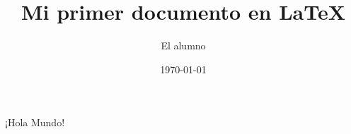 \documentclass{article}
\author{El alumno}
\title{Mi primer documento en \LaTeX}
\date{\today}
\begin{document}
\maketitle

¡Hola Mundo!
\end{document}
